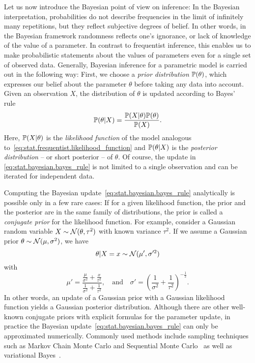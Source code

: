 Let us now introduce the Bayesian point of view on inference:
In the Bayesian interpretation, probabilities do not describe frequencies in the limit of infinitely many repetitions, but they reflect subjective degrees of belief.
In other words, in the Bayesian framework randomness reflects one's ignorance, or lack of knowledge of the value of a parameter.
In contrast to frequentist inference, this enables us to make probabilistic statements about the values of parameters even for a single set of observed data.
Generally, Bayesian inference for a parametric model is carried out in the following way:
First, we choose a \emph{prior distribution} $\mathbb{P}(\theta)$, which expresses our belief about the parameter $\theta$ before taking any data into account.
Given an observation $X$, the distribution of $\theta$ is updated according to Bayes' rule~\cite{}
\[
  \label{eq:stat.bayesian.bayes_rule}
  \mathbb{P}(\theta | X) = \frac{\mathbb{P}(X | \theta) \mathbb{P}(\theta)}{\mathbb{P}(X)}.
\]
Here, $\mathbb{P}(X|\theta)$ is the \emph{likelihood function} of the model analogous to~\eqref{eq:stat.frequentist.likelihood_function} and $\mathbb{P}(\theta | X)$ is the \emph{posterior distribution} -- or short posterior -- of $\theta$.
Of course, the update in \cref{eq:stat.bayesian.bayes_rule} is not limited to a single observation and can be iterated for independent data.

Computing the Bayesian update~\eqref{eq:stat.bayesian.bayes_rule} analytically is possible only in a few rare cases:
If for a given likelihood function, the prior and the posterior are in the same family of distributions, the prior is called a \emph{conjugate prior} for the likelihood function.
For example, consider a Gaussian random variable $X \sim \mathcal{N}(\theta, \tau^2)$ with known variance $\tau^2$.
If we assume a Gaussian prior $\theta \sim \mathcal{N}(\mu, \sigma^2)$, we have~\cite{}
\[
  \theta \vert X=x \sim \mathcal{N} (\mu', \sigma'^2)
\]
with
\[
  \label{eq:stat.bayesian.kalman}
  \mu' = \frac{ \frac{\mu}{\sigma^2} + \frac{x}{\tau^2} }{ \frac{1}{\sigma^2} + \frac{1}{\tau^2} },
  \quad\mbox{and}\quad
  \sigma' = \left( \frac{1}{\sigma^2} + \frac{1}{\tau^2} \right)^{- \tfrac{1}{2}}.
\]
In other words, an update of a Gaussian prior with a Gaussian likelihood function yields a Gaussian posterior distribution.
Although there are other well-known conjugate priors with explicit formulas for the parameter update, in practice the Bayesian update~\eqref{eq:stat.bayesian.bayes_rule} can only be approximated numerically.
Commonly used methods include sampling techniques such as Markov Chain Monte Carlo and Sequential Monte Carlo~\cite{} as well as variational Bayes~\cite{}.\\


